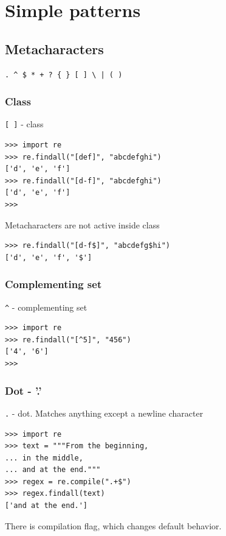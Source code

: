\documentclass{beamer}
\begin{document}
\section{Simple patterns}
\subsection{Metacharacters}
\begin{frame}[fragile]
\begin{verbatim}
. ^ $ * + ? { } [ ] \ | ( )
\end{verbatim}
\end{frame}

\subsubsection{Class}
\begin{frame}[fragile]
\verb/[ ]/ - class
\begin{lstlisting}
>>> import re
>>> re.findall("[def]", "abcdefghi")
['d', 'e', 'f']
>>> re.findall("[d-f]", "abcdefghi")
['d', 'e', 'f']
>>>
\end{lstlisting}
\pause
Metacharacters are not active inside class \\
\begin{lstlisting}
>>> re.findall("[d-f$]", "abcdefg$hi")
['d', 'e', 'f', '$']
\end{lstlisting}
\end{frame}

\subsubsection{Complementing set}
\begin{frame}[fragile]
\verb/^/ - complementing set
\begin{lstlisting}
>>> import re
>>> re.findall("[^5]", "456")
['4', '6']
>>>
\end{lstlisting}
\end{frame}

\subsubsection{Dot - '.'}
\begin{frame}[fragile]
\verb/./ - dot. Matches anything except a newline character
\begin{lstlisting}
>>> import re
>>> text = """From the beginning,
... in the middle,
... and at the end."""
>>> regex = re.compile(".+$")
>>> regex.findall(text)
['and at the end.']
\end{lstlisting}
\pause
There is compilation flag, which changes default behavior.
\end{frame}
\end{document}
